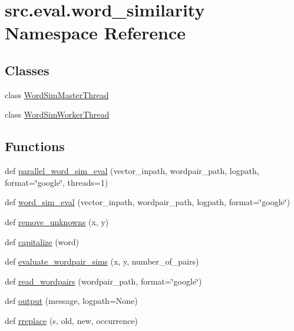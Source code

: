 \hypertarget{namespacesrc_1_1eval_1_1word__similarity}{}\section{src.\+eval.\+word\+\_\+similarity Namespace Reference}
\label{namespacesrc_1_1eval_1_1word__similarity}
\subsection*{Classes}
\begin{DoxyCompactItemize}
\item 
class \hyperlink{classsrc_1_1eval_1_1word__similarity_1_1_word_sim_master_thread}{Word\+Sim\+Master\+Thread}
\item 
class \hyperlink{classsrc_1_1eval_1_1word__similarity_1_1_word_sim_worker_thread}{Word\+Sim\+Worker\+Thread}
\end{DoxyCompactItemize}
\subsection*{Functions}
\begin{DoxyCompactItemize}
\item 
def \hyperlink{namespacesrc_1_1eval_1_1word__similarity_a1354f52478e8c8a08ab45fd57bc98900}{parallel\+\_\+word\+\_\+sim\+\_\+eval} (vector\+\_\+inpath, wordpair\+\_\+path, logpath, format=\char`\"{}google\char`\"{}, threads=1)
\item 
def \hyperlink{namespacesrc_1_1eval_1_1word__similarity_a625968df4faf09a29c29114eccfd1a25}{word\+\_\+sim\+\_\+eval} (vector\+\_\+inpath, wordpair\+\_\+path, logpath, format=\char`\"{}google\char`\"{})
\item 
def \hyperlink{namespacesrc_1_1eval_1_1word__similarity_a35413ae9492d04d2287dc9ef6b4a65fe}{remove\+\_\+unknowns} (x, y)
\item 
def \hyperlink{namespacesrc_1_1eval_1_1word__similarity_abea02377530269660e7b87bb6b587e90}{capitalize} (word)
\item 
def \hyperlink{namespacesrc_1_1eval_1_1word__similarity_a39c65ceec0a33401a8e87f56a8d1d71b}{evaluate\+\_\+wordpair\+\_\+sims} (x, y, number\+\_\+of\+\_\+pairs)
\item 
def \hyperlink{namespacesrc_1_1eval_1_1word__similarity_ae8cf8c4fbd45bc31c5487c5287343973}{read\+\_\+wordpairs} (wordpair\+\_\+path, format=\char`\"{}google\char`\"{})
\item 
def \hyperlink{namespacesrc_1_1eval_1_1word__similarity_a297370f72df98c0c9596594cfa741f70}{output} (message, logpath=None)
\item 
def \hyperlink{namespacesrc_1_1eval_1_1word__similarity_ab07a8c8006268073ec010c38d74b307e}{rreplace} (s, old, new, occurrence)
\end{DoxyCompactItemize}


